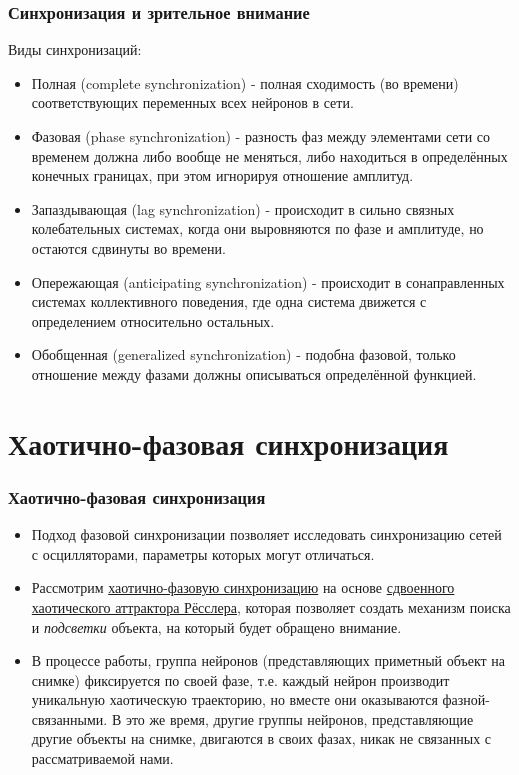 \documentclass{beamer}
\begin{document}

\begin{frame}
\frametitle{Синхронизация и зрительное внимание}

Виды синхронизаций:

\begin{itemize}
\item Полная (complete synchronization) -  полная сходимость (во времени) соответствующих переменных всех нейронов в сети.
\item Фазовая (phase synchronization) - разность фаз между элементами сети со временем должна либо вообще не меняться, либо находиться в определённых конечных границах, при этом игнорируя отношение амплитуд.
\item Запаздывающая (lag synchronization) - происходит в сильно связных колебательных системах, когда они выровняются по фазе и амплитуде, но остаются сдвинуты во времени.
\item Опережающая (anticipating synchronization) - происходит в сонаправленных системах коллективного поведения, где одна система движется с определением относительно остальных.
\item Обобщенная (generalized synchronization) - подобна фазовой, только отношение между фазами должны описываться определённой функцией.
\end{itemize}

\end{frame}


\section{Хаотично-фазовая синхронизация}

\begin{frame}
\frametitle{Хаотично-фазовая синхронизация}

\begin{itemize}
\item[]Подход фазовой синхронизации позволяет исследовать синхронизацию сетей с осцилляторами, параметры которых могут отличаться.
\bigskip
\item[]Рассмотрим \underline{хаотично-фазовую синхронизацию} на основе \underline{сдвоенного хаотического аттрактора Рёсслера}, которая позволяет создать механизм поиска и \textit{подсветки} объекта, на который будет обращено внимание.
\bigskip
\item[]В процессе работы, группа нейронов (представляющих приметный объект на снимке) фиксируется по своей фазе, т.е. каждый нейрон производит уникальную хаотическую траекторию, но вместе они оказываются фазной-связанными. В это же время, другие группы нейронов, представляющие другие объекты на снимке, двигаются в своих фазах, никак не связанных с рассматриваемой нами.
\end{itemize}

\end{frame}
\end{document}
